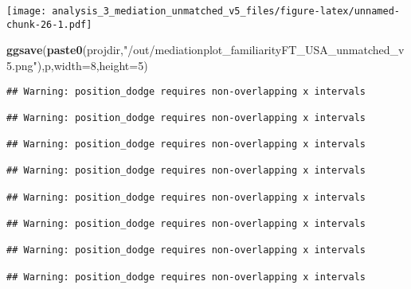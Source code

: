 \documentclass[
]{article}
\newenvironment{Shaded}{\begin{snugshade}}{\end{snugshade}}
\newcommand{\DataTypeTok}[1]{\textcolor[rgb]{0.13,0.29,0.53}{#1}}
\newcommand{\DecValTok}[1]{\textcolor[rgb]{0.00,0.00,0.81}{#1}}
\newcommand{\KeywordTok}[1]{\textcolor[rgb]{0.13,0.29,0.53}{\textbf{#1}}}
\newcommand{\NormalTok}[1]{#1}
\newcommand{\StringTok}[1]{\textcolor[rgb]{0.31,0.60,0.02}{#1}}
\begin{document}
\texttt{[image: analysis\_3\_mediation\_unmatched\_v5\_files/figure-latex/unnamed-chunk-26-1.pdf]}

\begin{Shaded}
\begin{Highlighting}[]
\KeywordTok{ggsave}\NormalTok{(}\KeywordTok{paste0}\NormalTok{(projdir,}\StringTok{"/out/mediationplot_familiarityFT_USA_unmatched_v5.png"}\NormalTok{),p,}\DataTypeTok{width=}\DecValTok{8}\NormalTok{,}\DataTypeTok{height=}\DecValTok{5}\NormalTok{)}
\end{Highlighting}
\end{Shaded}

\begin{verbatim}
## Warning: position_dodge requires non-overlapping x intervals

## Warning: position_dodge requires non-overlapping x intervals

## Warning: position_dodge requires non-overlapping x intervals

## Warning: position_dodge requires non-overlapping x intervals

## Warning: position_dodge requires non-overlapping x intervals

## Warning: position_dodge requires non-overlapping x intervals

## Warning: position_dodge requires non-overlapping x intervals

## Warning: position_dodge requires non-overlapping x intervals
\end{verbatim}
\end{document}
